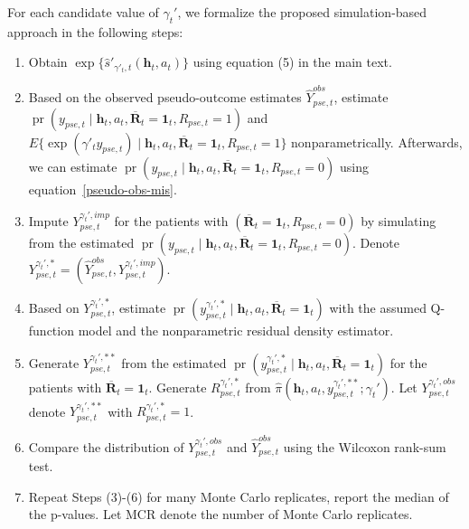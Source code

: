 \documentclass[12pt]{article}
\DeclareMathOperator{\pr}{pr}
\begin{document}
For each candidate value of $\gamma_t'$, we formalize the proposed simulation-based approach in the following steps:
\begin{enumerate}
    \item Obtain $\exp\{\widehat{s}'_{\gamma'_t,t}(\bm{h}_t,a_t) \}$ using equation (5) in the main text. 
    \item Based on the observed pseudo-outcome estimates $\widehat{Y}_{pse,t}^{obs}$, estimate $\pr(y_{pse,t}\mid \bm{h}_t,a_t,\overline{\bm{R}}_t = \bm{1}_t, R_{pse,t}=1)$ and $E\{\exp(\gamma'_t y_{pse,t}) \mid \bm{h}_t,a_t,\overline{\bm{R}}_t = \bm{1}_t, R_{pse,t}=1\}$ nonparametrically. Afterwards, we can estimate $\pr(y_{pse,t}\mid \bm{h}_t,a_t,\overline{\bm{R}}_t = \bm{1}_t,R_{pse,t}=0)$ using equation~\eqref{pseudo-obs-mis}.
    \item Impute $Y_{pse,t}^{\gamma_t',imp}$ for the patients with $(\overline{\bm{R}}_t = \bm{1}_t,R_{pse,t}=0)$  by simulating from the estimated $\pr(y_{pse,t}\mid \bm{h}_t,a_t,\overline{\bm{R}}_t = \bm{1}_t,R_{pse,t}=0)$. Denote $Y_{pse,t}^{\gamma_t',*} = (\widehat{Y}_{pse,t}^{obs}, Y_{pse,t}^{\gamma_t',imp})$.
    \item Based on $Y_{pse,t}^{\gamma_t',*}$, estimate $\pr(y_{pse,t}^{\gamma_t',*}\mid \bm{h}_t,a_t,\overline{\bm{R}}_t=\bm{1}_t)$ with the assumed Q-function model and the nonparametric residual density estimator.
    \item Generate $Y_{pse,t}^{\gamma_t',**}$ from the estimated  $\pr(y_{pse,t}^{\gamma_t',*}\mid \bm{h}_t,a_t, \overline{\bm{R}}_t=\bm{1}_t)$ for the patients with $\overline{\bm{R}}_t=\bm{1}_t$. Generate $R_{pse,t}^{\gamma_t',*}$ from $\widehat{\pi}(\bm{h}_t,a_t,y_{pse,t}^{\gamma_t',**};\gamma_t')$. Let $Y_{pse,t}^{\gamma_t',obs}$ denote  $Y_{pse,t}^{\gamma_t',**}$ with $R_{pse,t}^{\gamma_t',*}=1$.
    \item Compare the distribution of $Y_{pse,t}^{\gamma_t',obs}$ and $\widehat{Y}_{pse,t}^{obs}$ using the Wilcoxon rank-sum test.
    \item Repeat Steps (3)-(6) for many Monte Carlo replicates, report the median of the p-values. Let MCR denote the number of Monte Carlo replicates.
\end{enumerate}
\end{document}
